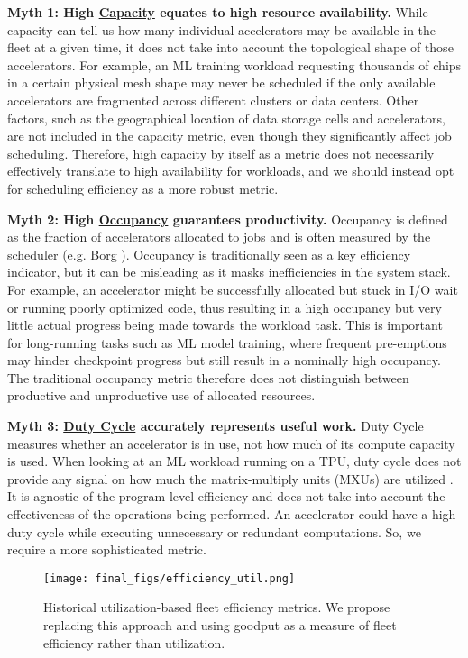 \textbf{Myth 1: High \underline{Capacity} equates to high resource availability.}
While capacity can tell us how many individual accelerators may be available in the fleet at a given time, it does not take into account the topological shape of those accelerators. For example, an ML training workload requesting thousands of chips in a certain physical mesh shape may never be scheduled if the only available accelerators are fragmented across different clusters or data centers. Other factors, such as the geographical location of data storage cells and accelerators, are not included in the capacity metric, even though they significantly affect job scheduling. Therefore, high capacity by itself as a metric does not necessarily effectively translate to high availability for workloads, and we should instead opt for scheduling efficiency as a more robust metric.

\textbf{Myth 2: High \underline{Occupancy} guarantees productivity.}
Occupancy is defined as the fraction of accelerators allocated to jobs and is often measured by the scheduler (e.g. Borg \cite{verma2015borg}). Occupancy is traditionally seen as a key efficiency indicator, but it can be misleading as it masks inefficiencies in the system stack. For example, an accelerator might be successfully allocated but stuck in I/O wait or running poorly optimized code, thus resulting in a high occupancy but very little actual progress being made towards the workload task. This is important for long-running tasks such as ML model training, where frequent pre-emptions may hinder checkpoint progress but still result in a nominally high occupancy. The traditional occupancy metric therefore does not distinguish between productive and unproductive use of allocated resources.

\textbf{Myth 3: \underline{Duty Cycle} accurately represents useful work.}
Duty Cycle measures whether an accelerator is in use, not how much of its compute capacity is used. When looking at an ML workload running on a TPU, duty cycle does not provide any signal on how much the matrix-multiply units (MXUs) are utilized \cite{jouppi2023tpuv4opticallyreconfigurable}. It is agnostic of the program-level efficiency and does not take into account the effectiveness of the operations being performed. An accelerator could have a high duty cycle while executing unnecessary or redundant computations. So, we require a more sophisticated metric.

\begin{figure}[t]
\centering
\texttt{[image: final\_figs/efficiency\_util.png]}
\caption{Historical utilization-based fleet efficiency metrics. We propose replacing this approach and using goodput as a measure of fleet efficiency rather than utilization.}
\label{fig:utilization}
\end{figure}

